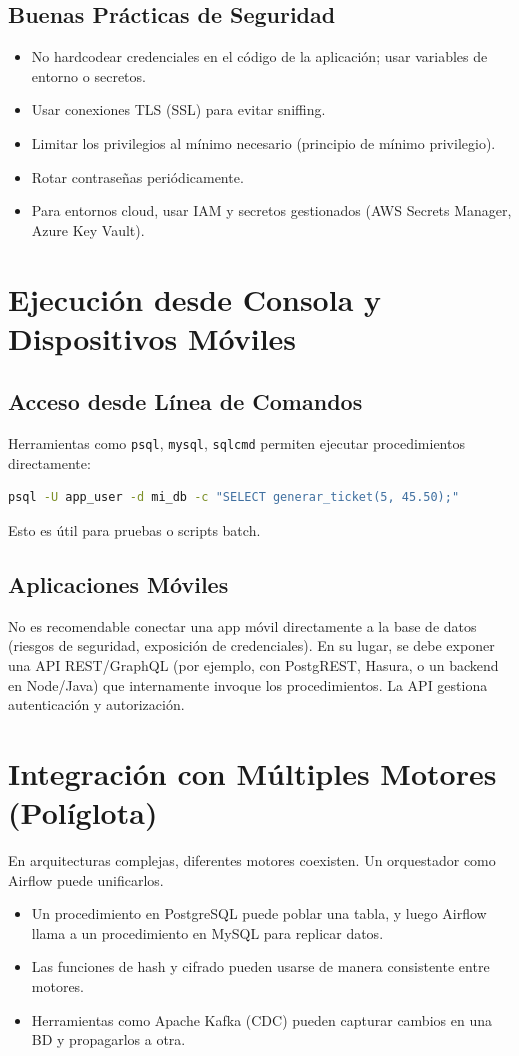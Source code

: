 \documentclass[12pt,a4paper,openany,oneside]{book}
\begin{document}
\subsection{Buenas Prácticas de Seguridad}
\begin{itemize}
    \item No hardcodear credenciales en el código de la aplicación; usar variables de entorno o secretos.
    \item Usar conexiones TLS (SSL) para evitar sniffing.
    \item Limitar los privilegios al mínimo necesario (principio de mínimo privilegio).
    \item Rotar contraseñas periódicamente.
    \item Para entornos cloud, usar IAM y secretos gestionados (AWS Secrets Manager, Azure Key Vault).
\end{itemize}

\section{Ejecución desde Consola y Dispositivos Móviles}
\subsection{Acceso desde Línea de Comandos}
Herramientas como \texttt{psql}, \texttt{mysql}, \texttt{sqlcmd} permiten ejecutar procedimientos directamente:
\begin{lstlisting}[language=bash]
psql -U app_user -d mi_db -c "SELECT generar_ticket(5, 45.50);"
\end{lstlisting}
Esto es útil para pruebas o scripts batch.

\subsection{Aplicaciones Móviles}
No es recomendable conectar una app móvil directamente a la base de datos (riesgos de seguridad, exposición de credenciales). En su lugar, se debe exponer una API REST/GraphQL (por ejemplo, con PostgREST, Hasura, o un backend en Node/Java) que internamente invoque los procedimientos. La API gestiona autenticación y autorización.

\section{Integración con Múltiples Motores (Políglota)}
En arquitecturas complejas, diferentes motores coexisten. Un orquestador como Airflow puede unificarlos.
\begin{itemize}
    \item Un procedimiento en PostgreSQL puede poblar una tabla, y luego Airflow llama a un procedimiento en MySQL para replicar datos.
    \item Las funciones de hash y cifrado pueden usarse de manera consistente entre motores.
    \item Herramientas como Apache Kafka (CDC) pueden capturar cambios en una BD y propagarlos a otra.
\end{itemize}
\end{document}

